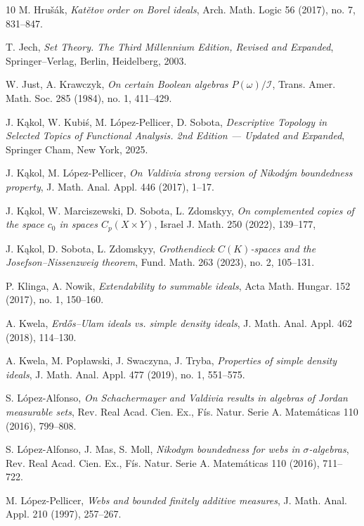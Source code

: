 \documentclass[a4paper,11pt,fleqn]{amsart}
\theoremstyle{definition}
\theoremstyle{remark}
\numberwithin{equation}{section}
\newcommand{\iI}{\mathcal{I}}
\begin{document}
\begin{thebibliography}{10}
 M. Hru\v{s}\'{a}k, \textit{Kat\v{e}tov order on Borel ideals}, Arch. Math. Logic 56 (2017), no. 7, 831--847.

 T. Jech, \textit{Set Theory. The Third Millennium Edition, Revised and Expanded}, Springer--Verlag,  Berlin, Heidelberg, 2003.

 W. Just, A. Krawczyk, \textit{On certain Boolean algebras $P(\omega)/\iI$}, Trans. Amer. Math. Soc. 285 (1984), no. 1, 411--429.

 J. K\k{a}kol, W. Kubi\'{s}, M. L\'{o}pez-Pellicer, D. Sobota, \textit{Descriptive Topology in Selected Topics of Functional Analysis. 2nd Edition --- Updated and Expanded}, Springer Cham, New York, 2025.

 J. K\k{a}kol, M. L\'opez-Pellicer, \textit{On Valdivia strong version of Nikod\'ym boundedness property}, J. Math. Anal. Appl. 446 (2017), 1--17.

 J. K\k{a}kol, W. Marciszewski, D. Sobota, L. Zdomskyy, \textit{On complemented copies of the space $c_0$ in spaces $C_p(X\times Y)$}, Israel J. Math. 250 (2022), 139--177,

 J. K\k{a}kol, D. Sobota, L. Zdomskyy, \textit{Grothendieck $C(K)$-spaces and the Josefson–Nissenzweig theorem}, Fund. Math. 263 (2023), no. 2, 105--131.

 P. Klinga, A. Nowik, \textit{Extendability to summable ideals}, Acta Math. Hungar. 152 (2017), no. 1, 150--160.

 A. Kwela, \textit{Erd\H{o}s--Ulam ideals vs. simple density ideals}, J. Math. Anal. Appl. 462 (2018), 114--130.

 A. Kwela, M. Pop\l awski, J. Swaczyna, J. Tryba, \textit{Properties of simple density ideals}, J. Math. Anal. Appl. 477 (2019), no. 1, 551--575.

 S. L\'opez-Alfonso, \textit{On Schachermayer and Valdivia results in algebras of Jordan measurable sets}, Rev. Real Acad. Cien. Ex., F\'is. Natur. Serie A. Matem\'aticas 110 (2016), 799--808.

 S. L\'opez-Alfonso, J. Mas, S. Moll, \textit{Nikodym boundedness for webs in $\sigma$-algebras}, Rev. Real Acad. Cien. Ex., F\'is. Natur. Serie A. Matem\'aticas 110 (2016), 711--722.

 M. L\'opez-Pellicer, \textit{Webs and bounded finitely additive measures}, J. Math. Anal. Appl. 210 (1997), 257--267.


\end{thebibliography}
\end{document}
